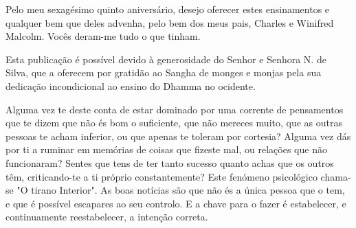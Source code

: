 \clearpage
\thispagestyle{empty}

{}

\vspace*{0.8\baselineskip}

Pelo meu sexagésimo quinto aniversário, desejo oferecer estes
ensinamentos e qualquer bem que deles advenha, pelo bem dos meus pais,
Charles e Winifred Malcolm. Vocês deram-me tudo o que tinham.

\clearpage
\thispagestyle{empty}

{}

\enlargethispage*{\baselineskip}

\vspace*{0.8\baselineskip}

Esta publicação é possível devido à generosidade do Senhor e Senhora N.
de Silva, que a oferecem por gratidão ao Sangha de monges e monjas pela
sua dedicação incondicional ao ensino do Dhamma no ocidente.

Alguma vez te deste conta de estar dominado por uma corrente de
pensamentos que te dizem que não és bom o suficiente, que não mereces
muito, que as outras pessoas te acham inferior, ou que apenas te toleram
por cortesia? Alguma vez dás por ti a ruminar em memórias de coisas que
fizeste mal, ou relações que não funcionaram? Sentes que tens de ter
tanto sucesso quanto achas que os outros têm, criticando-te a ti próprio
constantemente? Este fenómeno psicológico chama-se "O tirano Interior".
As boas notícias são que não és a única pessoa que o tem, e que é
possível escapares ao seu controlo. E a chave para o fazer é
estabelecer, e continuamente reestabelecer, a intenção correta.

